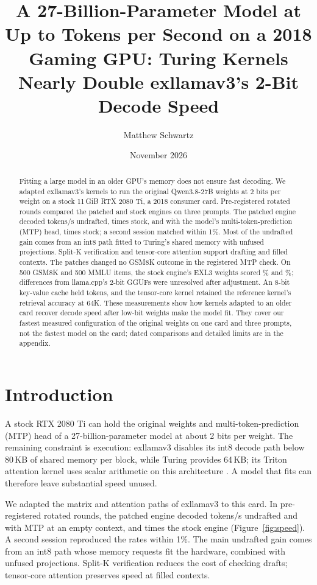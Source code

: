 \documentclass[11pt,letterpaper]{article}
\title{\textbf{A 27-Billion-Parameter Model at Up to \PeTitleMtpRate{} Tokens per Second on a 2018 Gaming GPU: Turing Kernels Nearly Double exllamav3’s 2-Bit Decode Speed}}
\author{Matthew Schwartz\singleauthorinfo{Independent researcher \enspace
\href{https://orcid.org/0009-0009-4171-7247}{ORCID 0009-0009-4171-7247}
\enspace \href{mailto:matthew.schwartz.research@gmail.com}{\texttt{matthew.schwartz.research@gmail.com}}}}
\date{November 2026}
\begin{document}
\maketitle

\begin{abstract}
\noindent
Fitting a large model in an older GPU's memory does not ensure fast decoding.
We adapted exllamav3's kernels to run the original Qwen3.8-27B weights at
2 bits per weight on a stock 11\,GiB RTX 2080 Ti, a 2018 consumer card.
Pre-registered rotated rounds compared the patched and stock engines on
three prompts. The patched engine decoded \PeFtWZero{} tokens/s undrafted,
\PeFtUndraftedRatio{} times stock, and \PeFtSTwoMtpZero{} with the model's
multi-token-prediction (MTP) head, \PeFtMtpRatio{} times stock; a second
session matched within 1\%. Most of the undrafted gain comes from an int8
path fitted to Turing's shared memory with unfused projections. Split-K
verification and tensor-core attention support drafting and filled contexts.
The patches changed no GSM8K outcome in the registered MTP check. On 500
GSM8K and 500 MMLU items, the stock engine's EXL3 weights scored
\PeQGsmExlNoAcc\% and \PeQMmluExlNoAcc\%; differences from llama.cpp's 2-bit
GGUFs were unresolved after adjustment. An 8-bit key-value cache held
\PeReachEE{} tokens, and the tensor-core kernel retained the reference
kernel's retrieval accuracy at 64K. These measurements show how kernels
adapted to an older card recover decode speed after low-bit weights make
the model fit. They cover our fastest measured configuration of the original
weights on one card and three prompts, not the fastest model on the card;
dated comparisons and detailed limits are in the appendix.
\end{abstract}


\section{Introduction}
\label{sec:intro}
A stock RTX 2080 Ti can hold the original weights and multi-token-prediction
(MTP) head of a 27-billion-parameter model at about 2 bits per weight.
The remaining constraint is execution: exllamav3 disables its int8 decode
path below 80\,KB of shared memory per block, while Turing provides 64\,KB;
its Triton attention kernel uses scalar arithmetic on this architecture
\citep{triton5066}. A model that fits can therefore leave substantial speed
unused.

We adapted the matrix and attention paths of exllamav3 to this card.
In pre-registered rotated rounds, the patched engine decoded
\PeFtWZero{} tokens/s undrafted and \PeFtSTwoMtpZero{} with MTP at an empty
context, \PeFtUndraftedRatio{} and \PeFtMtpRatio{} times the stock engine
(Figure~\ref{fig:speed}). A second session reproduced the rates within 1\%.
The main undrafted gain comes from an int8 path whose memory requests fit
the hardware, combined with unfused projections. Split-K verification
reduces the cost of checking drafts; tensor-core attention preserves speed
at filled contexts.
\end{document}
